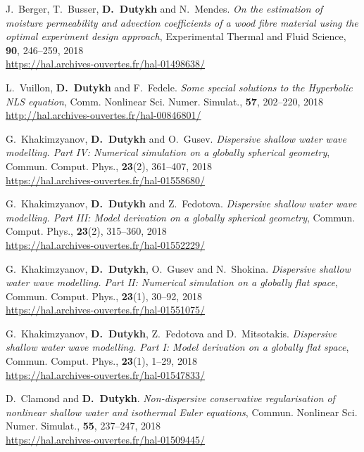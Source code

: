 \begin{etaremune}
  \item J.~Berger, T.~Busser, \textbf{D.~Dutykh} and N.~Mendes. \textit{On the estimation of moisture permeability and advection coefficients of a wood fibre material using the optimal experiment design approach}, Experimental Thermal and Fluid Science, \textbf{90}, 246--259, 2018 \\ %
  \url{https://hal.archives-ouvertes.fr/hal-01498638/}
  
  \item L.~Vuillon, \textbf{D.~Dutykh} and F.~Fedele. \textit{Some special solutions to the Hyperbolic NLS equation}, Comm. Nonlinear Sci. Numer. Simulat., \textbf{57}, 202--220, 2018 \\ %
  \url{http://hal.archives-ouvertes.fr/hal-00846801/}

  \item G.~Khakimzyanov, \textbf{D.~Dutykh} and O.~Gusev. \textit{Dispersive shallow water wave modelling. Part IV: Numerical simulation on a globally spherical geometry}, Commun. Comput. Phys., \textbf{23}(2), 361--407, 2018 \\ %
  \url{https://hal.archives-ouvertes.fr/hal-01558680/}

  \item G.~Khakimzyanov, \textbf{D.~Dutykh} and Z.~Fedotova. \textit{Dispersive shallow water wave modelling. Part III: Model derivation on a globally spherical geometry}, Commun. Comput. Phys., \textbf{23}(2), 315--360, 2018 \\ %
  \url{https://hal.archives-ouvertes.fr/hal-01552229/}

  \item G.~Khakimzyanov, \textbf{D.~Dutykh}, O.~Gusev and N.~Shokina. \textit{Dispersive shallow water wave modelling. Part II: Numerical simulation on a globally flat space}, Commun. Comput. Phys., \textbf{23}(1), 30--92, 2018 \\ %
  \url{https://hal.archives-ouvertes.fr/hal-01551075/}

  \item G.~Khakimzyanov, \textbf{D.~Dutykh}, Z.~Fedotova and D.~Mitsotakis. \textit{Dispersive shallow water wave modelling. Part I: Model derivation on a globally flat space}, Commun. Comput. Phys., \textbf{23}(1), 1--29, 2018 \\ %
  \url{https://hal.archives-ouvertes.fr/hal-01547833/}
  
  \item D.~Clamond and \textbf{D.~Dutykh}. \textit{Non-dispersive conservative regularisation of nonlinear shallow water and isothermal Euler equations}, Commun. Nonlinear Sci. Numer. Simulat., \textbf{55}, 237--247, 2018 \\ %
  \url{https://hal.archives-ouvertes.fr/hal-01509445/}
  

\end{etaremune}
